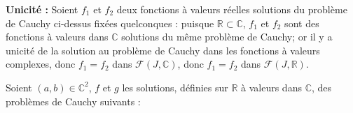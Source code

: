 \documentclass{article}
\begin{document}
\begin{question_kholle}
\textbf{Unicité : }Soient $f_{1}$ et $f_{2}$ deux fonctions à valeurs réelles solutions du problème de Cauchy ci-dessus fixées quelconques : puisque $\mathbb{R} \subset \mathbb{C}$, $f_{1}$ et $f_{2}$ sont des fonctions à valeurs dans $\mathbb{C}$ solutions du même problème de Cauchy; or il y a unicité de la solution au problème de Cauchy dans les fonctions à valeurs complexes, donc $f_{1} = f_{2}$ dans $\mathcal{F}(J, \mathbb{C})$, donc $f_{1} = f_{2}$ dans $\mathcal{F}(J, \mathbb{R})$.
\end{question_kholle}

\begin{question_kholle}[
	\[
	    \left\{ \begin{array}{cl}
	        y'' +ay'+by = 0 \\
	        y(3) = 1\\
	        y'(3) = 0
	        \end{array} \right.        
		\quad \text{et} \quad
	    \left\{ \begin{array}{cl}
	        y'' +ay'+by = 0 \\
	        y(3) = 0\\
	        y'(3) = 1
	        \end{array} \right.
	\]
	
	Comment s'exprime la solution définie sur $\mathbb{R}$ de $\left\{ \begin{array}{cl}
	    y'' +ay'+by = 0 \\
	    y(3) = \alpha \\
	    y'(3) = \beta
	    \end{array} \right. $ pour $(\alpha, \beta)\in \mathbb{R}^2$ fixés ? 
	
	Peut-on affirmer que le plan vectoriel des solutions définies sur $\mathbb{R}$ à valeurs dans 
	$\mathbb{C}$ de $y'' + ay' + by = 0$ est $\{ \lambda \cdot f + \mu \cdot g  | 
	(\lambda, \mu)\in \mathbb{C}^2\}$
	]
	{Soient $(a,b)\in \mathbb{C}^2$, $f$ et $g$ les  solutions, définies sur $\mathbb{R}$ à valeurs
		dans $\mathbb{C}$, des problèmes de Cauchy suivants :}


\end{question_kholle}
\end{document}

